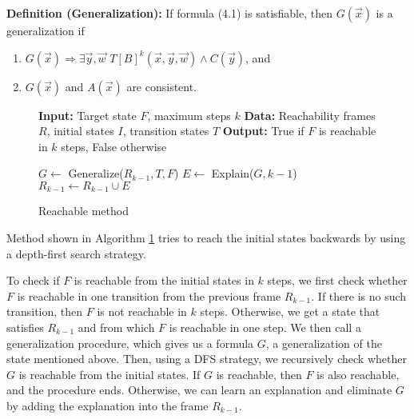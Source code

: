\noindent    \textbf{Definition (Generalization)\cite{7886665}:} If formula (4.1) is satisfiable, then $G(\vec{x})$ is a generalization if
    \begin{enumerate}
        \item $G(\vec{x}) \Rightarrow \exists \vec{y}, \vec{w}$  $T[B]^k(\vec{x}, \vec{y}, \vec{w}) \wedge C(\vec{y})$, and
        \item $G(\vec{x})$ and $A(\vec{x})$ are consistent.
\end{enumerate}

\renewcommand{\figurename}{Algorithm}
\begin{figure}[h]
\begin{mdframed}
\begin{algorithmic}[1]
\State \textbf{Input:} Target state $F$, maximum steps $k$
\State \textbf{Data:} Reachability frames $R$, initial states $I$, transition states $T$
\State \textbf{Output:} True if $F$ is reachable in $k$ steps, False otherwise

    \State {}
\EndIf

        \State $G \gets$ Generalize($R_{k-1}, T, F$)
            \State {}
        \Else
            \State $E \gets$ Explain($G, k-1$)
            \State $R_{k-1} \gets R_{k-1} \cup E$
        \EndIf
    \Else
        \State {}
    \EndIf
\EndWhile

\end{algorithmic}
\end{mdframed}
\caption{Reachable method}\label{alg:1}
\end{figure}

\noindent Method shown in Algorithm \ref{alg:1} tries to reach the initial states backwards by using a depth-first search strategy.

To check if \( F \) is reachable from the initial states in \( k \) steps, we first check whether \( F \) is reachable in one transition from the previous frame \( R_{k-1} \). If there is no such transition, then \( F \) is not reachable in \( k \) steps. Otherwise, we get a state that satisfies \( R_{k-1} \) and from which \( F \) is reachable in one step. We then call a generalization procedure, which gives us a formula \( G \), a generalization of the state mentioned above. Then, using a DFS strategy, we recursively check whether \( G \) is reachable from the initial states. If \( G \) is reachable, then \( F \) is also reachable, and the procedure ends. Otherwise, we can learn an explanation and eliminate \( G \) by adding the explanation into the frame \( R_{k-1} \).

